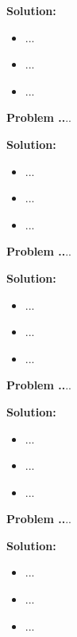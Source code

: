 \documentclass{article}
\theoremstyle{problemstyle}
\newenvironment{boxedproblem}[1]
{\begin{tcolorbox}[colback=white, colframe=black, boxrule=0.5pt]\noindent\textbf{Problem #1.}}
{\end{tcolorbox}}
\begin{document}
\textbf{Solution:}
\begin{itemize}[label={},leftmargin=1.25cm,nosep]
    \item ...
    \item ...
    \item ...
\end{itemize}


\begin{boxedproblem}{4}
...
\end{boxedproblem}

\textbf{Solution:}
\begin{itemize}[label={},leftmargin=1.25cm,nosep]
    \item ...
    \item ...
    \item ...
\end{itemize}


\begin{boxedproblem}{5}
...
\end{boxedproblem}

\textbf{Solution:}
\begin{itemize}[label={},leftmargin=1.25cm,nosep]
    \item ...
    \item ...
    \item ...
\end{itemize}


\begin{boxedproblem}{6}
...
\end{boxedproblem}

\textbf{Solution:}
\begin{itemize}[label={},leftmargin=1.25cm,nosep]
    \item ...
    \item ...
    \item ...
\end{itemize}


\begin{boxedproblem}{7}
...
\end{boxedproblem}

\textbf{Solution:}
\begin{itemize}[label={},leftmargin=1.25cm,nosep]
    \item ...
    \item ...
    \item ...
\end{itemize}
\end{document}
